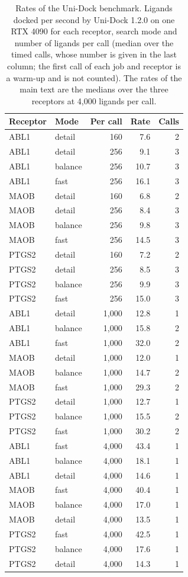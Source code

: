 \begin{table}[h]
\caption{Rates of the Uni-Dock benchmark. Ligands docked per second by Uni-Dock 1.2.0 on one RTX 4090 for each receptor, search mode and number of ligands per call (median over the timed calls, whose number is given in the last column; the first call of each job and receptor is a warm-up and is not counted). The rates of the main text are the medians over the three receptors at 4{,}000 ligands per call.}
\label{tab:si_speed}
\small
\begin{tabular}{llrrr}
\toprule
Receptor & Mode & Per call & Rate & Calls \\
\midrule
ABL1 & detail & 160 & 7.6 & 2 \\
ABL1 & detail & 256 & 9.1 & 3 \\
ABL1 & balance & 256 & 10.7 & 3 \\
ABL1 & fast & 256 & 16.1 & 3 \\
MAOB & detail & 160 & 6.8 & 2 \\
MAOB & detail & 256 & 8.4 & 3 \\
MAOB & balance & 256 & 9.8 & 3 \\
MAOB & fast & 256 & 14.5 & 3 \\
PTGS2 & detail & 160 & 7.2 & 2 \\
PTGS2 & detail & 256 & 8.5 & 3 \\
PTGS2 & balance & 256 & 9.9 & 3 \\
PTGS2 & fast & 256 & 15.0 & 3 \\
ABL1 & detail & 1{,}000 & 12.8 & 1 \\
ABL1 & balance & 1{,}000 & 15.8 & 2 \\
ABL1 & fast & 1{,}000 & 32.0 & 2 \\
MAOB & detail & 1{,}000 & 12.0 & 1 \\
MAOB & balance & 1{,}000 & 14.7 & 2 \\
MAOB & fast & 1{,}000 & 29.3 & 2 \\
PTGS2 & detail & 1{,}000 & 12.7 & 1 \\
PTGS2 & balance & 1{,}000 & 15.5 & 2 \\
PTGS2 & fast & 1{,}000 & 30.2 & 2 \\
ABL1 & fast & 4{,}000 & 43.4 & 1 \\
ABL1 & balance & 4{,}000 & 18.1 & 1 \\
ABL1 & detail & 4{,}000 & 14.6 & 1 \\
MAOB & fast & 4{,}000 & 40.4 & 1 \\
MAOB & balance & 4{,}000 & 17.0 & 1 \\
MAOB & detail & 4{,}000 & 13.5 & 1 \\
PTGS2 & fast & 4{,}000 & 42.5 & 1 \\
PTGS2 & balance & 4{,}000 & 17.6 & 1 \\
PTGS2 & detail & 4{,}000 & 14.3 & 1 \\
\bottomrule
\end{tabular}
\end{table}

